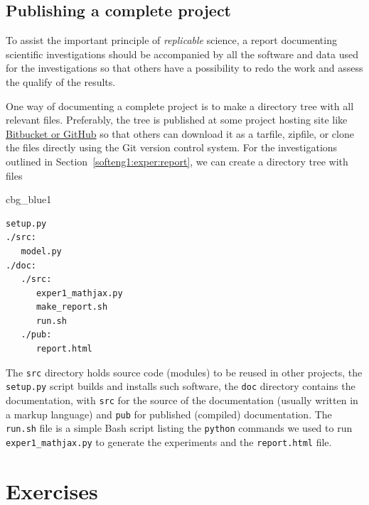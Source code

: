\documentclass[%
oneside,                 %
final,                   %
10pt]{article}
\newenvironment{_cod_tight}[1]{
   \def\FrameCommand{\colorbox{#1}}
   \FrameRule0.6pt\MakeFramed {\FrameRestore}\vskip3mm}
   {\vskip0mm\endMakeFramed}
\newenvironment{cod}[1]{
\bgroup\rmfamily
\fboxsep=0mm\relax
\begin{_cod_tight}{#1}
\list{}{\parsep=-2mm\parskip=0mm\topsep=0pt\leftmargin=2mm
\rightmargin=2\leftmargin\leftmargin=4pt\relax}
\item\relax}
{\endlist\end{_cod_tight}\egroup}
\begin{document}

\subsection{Publishing a complete project}
\label{softeng1:exper:github}


To assist the important principle of \emph{replicable} science,
a report documenting scientific investigations should be accompanied by
all the software and data used for the investigations so that others
have a possibility to redo the work and assess the qualify of the results.

One way of documenting a complete project is to make a directory tree
with all relevant files. Preferably, the tree is published at
some project hosting site like \href{{http://hplgit.github.com/teamods/bitgit/html/}}{Bitbucket or GitHub} so that others can download it
as a tarfile, zipfile, or clone the files directly using the Git version control
system.
For the investigations outlined in Section~\ref{softeng1:exper:report},
we can create a directory tree with files
\begin{cod}{cbg_blue1}\begin{Verbatim}[numbers=none,fontsize=\fontsize{9pt}{9pt},baselinestretch=0.95,xleftmargin=2mm]
setup.py
./src:
   model.py
./doc:
   ./src:
      exper1_mathjax.py
      make_report.sh
      run.sh
   ./pub:
      report.html
\end{Verbatim}
\end{cod}
\noindent
The \texttt{src} directory holds source code (modules) to be reused in other projects,
the \texttt{setup.py} script builds and installs such software,
the \texttt{doc} directory contains the documentation, with \texttt{src} for the
source of the documentation (usually written in a markup language)
and \texttt{pub} for published (compiled) documentation.
The \texttt{run.sh} file is a simple Bash script listing the \texttt{python} commands
we used to run \Verb!exper1_mathjax.py! to generate the experiments and
the \texttt{report.html} file.



\section{Exercises}
\end{document}
